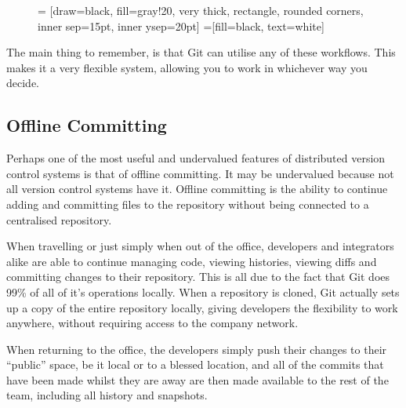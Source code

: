 \begin{figure}[hbt]
 = [draw=black, fill=gray!20, very thick, rectangle, rounded corners, inner sep=15pt, inner ysep=20pt]
 =[fill=black, text=white]
\end{figure}

The main thing to remember, is that Git can utilise any of these workflows.  This makes it a very flexible system, allowing you to work in whichever way you decide.

\subsection{Offline Committing}

Perhaps one of the most useful and undervalued features of distributed version control systems is that of offline committing.  It may be undervalued because not all version control systems have it.  Offline committing is the ability to continue adding and committing files to the repository without being connected to a centralised repository.  

When travelling or just simply when out of the office, developers and integrators alike are able to continue managing code, viewing histories, viewing diffs and committing changes to their repository.  This is all due to the fact that Git does 99\% of all of it's operations locally.  When a repository is cloned, Git actually sets up a copy of the entire repository locally, giving developers the flexibility to work anywhere, without requiring access to the company network.

When returning to the office, the developers simply push their changes to their ``public'' space, be it local or to a blessed location, and all of the commits that have been made whilst they are away are then made available to the rest of the team, including all history and snapshots.

